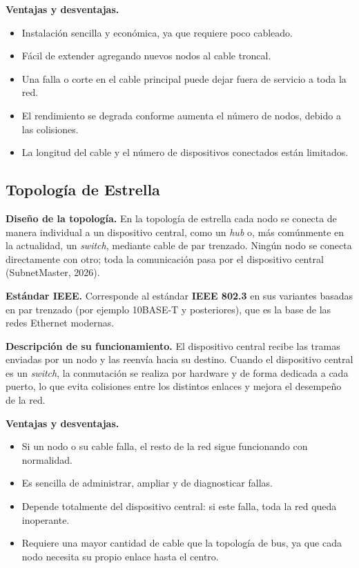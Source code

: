 \documentclass[12pt,letterpaper]{article}
\begin{document}
\textbf{Ventajas y desventajas.}
\begin{itemize}[nosep]
    \item[+] Instalación sencilla y económica, ya que requiere poco cableado.
    \item[+] Fácil de extender agregando nuevos nodos al cable troncal.
    \item[$-$] Una falla o corte en el cable principal puede dejar fuera de servicio a toda la red.
    \item[$-$] El rendimiento se degrada conforme aumenta el número de nodos, debido a las colisiones.
    \item[$-$] La longitud del cable y el número de dispositivos conectados están limitados.
\end{itemize}

\subsection{Topología de Estrella}

\textbf{Diseño de la topología.} En la topología de estrella cada nodo se conecta de manera individual a un dispositivo central, como un \textit{hub} o, más comúnmente en la actualidad, un \textit{switch}, mediante cable de par trenzado. Ningún nodo se conecta directamente con otro; toda la comunicación pasa por el dispositivo central (SubnetMaster, 2026).

\textbf{Estándar IEEE.} Corresponde al estándar \textbf{IEEE 802.3} en sus variantes basadas en par trenzado (por ejemplo 10BASE-T y posteriores), que es la base de las redes Ethernet modernas.

\textbf{Descripción de su funcionamiento.} El dispositivo central recibe las tramas enviadas por un nodo y las reenvía hacia su destino. Cuando el dispositivo central es un \textit{switch}, la conmutación se realiza por hardware y de forma dedicada a cada puerto, lo que evita colisiones entre los distintos enlaces y mejora el desempeño de la red.

\textbf{Ventajas y desventajas.}
\begin{itemize}[nosep]
    \item[+] Si un nodo o su cable falla, el resto de la red sigue funcionando con normalidad.
    \item[+] Es sencilla de administrar, ampliar y de diagnosticar fallas.
    \item[$-$] Depende totalmente del dispositivo central: si este falla, toda la red queda inoperante.
    \item[$-$] Requiere una mayor cantidad de cable que la topología de bus, ya que cada nodo necesita su propio enlace hasta el centro.
\end{itemize}
\end{document}
